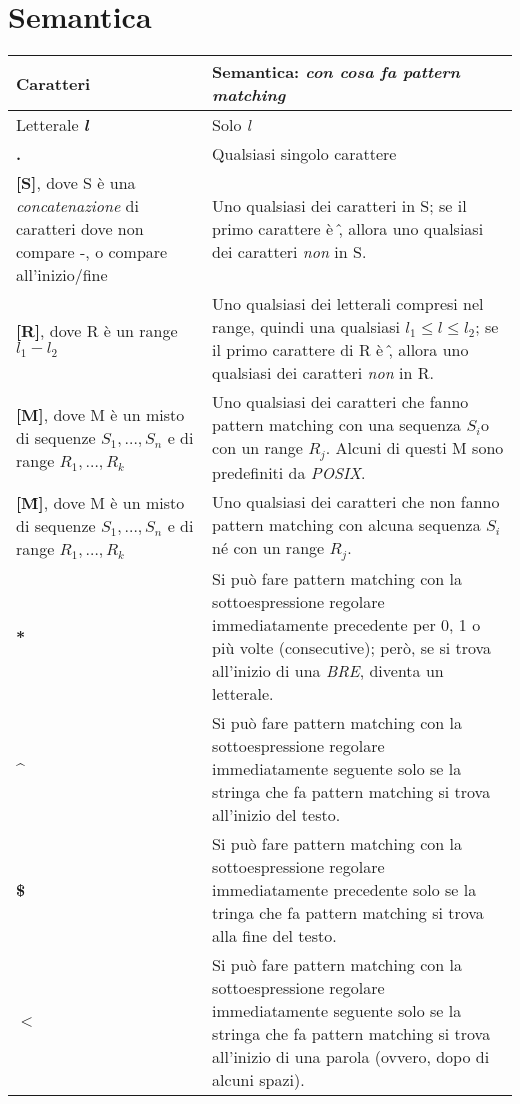 \section{Semantica}
\begin{center}
     \label{tab:table-bre}
	\begin{tabular}{|p{3cm}|p{10cm}|}
	\hline
		\textbf{Caratteri} & \textbf{Semantica: \textit{con cosa fa pattern matching}} \\ \hline
		Letterale \textit{\textbf{l}}	& Solo \textit{l} \\ \hline
		\textbf{.}			& Qualsiasi singolo carattere \\ \hline
		\textbf{[S]}, dove S è una \textit{concatenazione} di caratteri dove non compare -, o compare all'inizio/fine	& Uno qualsiasi dei caratteri in S; se il primo carattere è \^, allora uno qualsiasi dei caratteri \textit{non} in S. \\ \hline
		\textbf{[R]}, dove R è un range $ l_{1} - l_{2} $	& Uno qualsiasi dei letterali compresi nel range, quindi una qualsiasi $ l_{1} \leq l \leq l_{2} $; se il primo carattere di R è \^, allora uno qualsiasi dei caratteri \textit{non} in R. \\ \hline
		\textbf{[M]}, dove M è un misto di sequenze $ S_{1},\ldots,S_{n} $ e di range $ R_{1},\ldots,R_{k} $   & Uno qualsiasi dei caratteri che fanno pattern matching con una sequenza $ S_{i} $o con un range $ R_{j} $. Alcuni di questi M sono predefiniti da \textit{POSIX}. \\ \hline
		\textbf{[\^M]}, dove M è un misto di sequenze $ S_{1},\ldots,S_{n} $ e di range $ R_{1},\ldots,R_{k} $  & Uno qualsiasi dei caratteri che non fanno pattern matching con alcuna sequenza $ S_{i} $ né con un range $ R_{j} $. \\ \hline
		\textbf{*}			& Si può fare pattern matching con la sottoespressione regolare immediatamente precedente per 0, 1 o più volte (consecutive); però, se si trova all'inizio di una \textit{BRE}, diventa un letterale. \\ \hline
		\textbf{\^}		& Si può fare pattern matching con la sottoespressione regolare immediatamente seguente solo se la stringa che fa pattern matching si trova all'inizio del testo. \\ \hline
		\textbf{\$}			& Si può fare pattern matching con la sottoespressione regolare immediatamente precedente solo se la tringa che fa pattern matching si trova alla fine del testo. \\ \hline
		\textbf{$<$}			& Si può fare pattern matching con la sottoespressione regolare immediatamente seguente solo se la stringa che fa pattern matching si trova all'inizio di una parola (ovvero, dopo di alcuni spazi). \\ \hline

\end{tabular}
\end{center}
